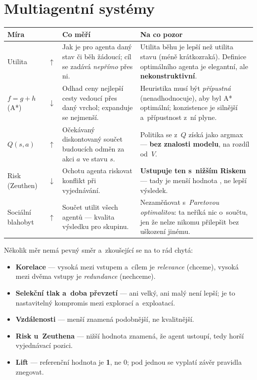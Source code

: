 \documentclass[11pt,a4paper]{article}
\makeatletter
\newcommand{\up}{\textcolor{upcol}{$\boldsymbol{\uparrow}$}}
\newcommand{\down}{\textcolor{downcol}{$\boldsymbol{\downarrow}$}}
\newenvironment{mirytab}{%
  \par\medskip\noindent\small
  \begin{tabular}{@{}>{\raggedright\arraybackslash}p{3.15cm}
                    >{\centering\arraybackslash}p{0.85cm}
                    >{\raggedright\arraybackslash}p{5.3cm}
                    >{\raggedright\arraybackslash}p{6.1cm}@{}}
  \toprule
  \textbf{Míra} & & \textbf{Co měří} & \textbf{Na co pozor} \\
  \midrule}%
  {\bottomrule\end{tabular}\par\medskip}
\makeatother
\begin{document}
\section{Multiagentní systémy}

\begin{mirytab}
Utilita & \up &
Jak je pro agenta daný stav či běh žádoucí; cíl se zadává \emph{nepřímo} přes ni. &
Utilita běhu je lepší než utilita stavu (méně krátkozraká). Definice optimálního agenta
je elegantní, ale \textbf{nekonstruktivní}. \\[2pt]

$f = g + h$ (A*) & \down &
Odhad ceny nejlepší cesty vedoucí přes daný vrchol; expanduje se nejmenší. &
Heuristika musí být \emph{přípustná} (nenadhodnocuje), aby byl A* optimální;
konzistence je silnější a~přípustnost z~ní plyne. \\[2pt]

$Q(s,a)$ & \up &
Očekávaný diskontovaný součet budoucích odměn za akci $a$ ve stavu $s$. &
Politika se z~$Q$ získá jako argmax --- \textbf{bez znalosti modelu}, na rozdíl
od~$V$. \\[2pt]

Risk (Zeuthen) & \down &
Ochotu agenta riskovat konflikt při vyjednávání. &
\textbf{Ustupuje ten s~nižším Riskem} --- tady je menší hodnota \uv{horší pozice},
ne lepší výsledek. \\[2pt]

Sociální blahobyt & \up &
Součet utilit všech agentů --- kvalita výsledku pro skupinu. &
Nezaměňovat s~\emph{Paretovou optimalitou}: ta neříká nic o~součtu, jen že nelze nikomu
přilepšit bez uškození jinému. \\
\end{mirytab}

\begin{poznbox}
\small
Několik měr nemá pevný  směr a~zkoušející se na to rád chytá:

\begin{itemize}
\item \textbf{Korelace} --- vysoká mezi vstupem a~cílem je \emph{relevance} (chceme),
      vysoká mezi dvěma vstupy je \emph{redundance} (nechceme).
\item \textbf{Selekční tlak a~doba převzetí} --- ani velký, ani malý není lepší; je to
      nastavitelný kompromis mezi explorací a~exploatací.
\item \textbf{Vzdálenosti} --- menší znamená podobnější, ne kvalitnější.
\item \textbf{Risk u~Zeuthena} --- nižší hodnota znamená, že agent ustoupí, tedy horší
      vyjednávací pozici.
\item \textbf{Lift} --- referenční hodnota je \textbf{1}, ne 0; pod jednou se vyplatí
      závěr pravidla znegovat.
\end{itemize}
\end{poznbox}
\end{document}
